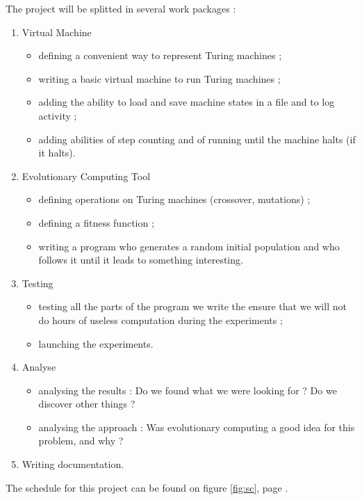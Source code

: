 \documentclass{article}
\begin{document}
The project will be splitted in several work packages :
\begin{enumerate}
\item Virtual Machine 
  \begin{itemize}
  \item defining a convenient way to represent Turing machines ;
  \item writing a basic virtual machine to run Turing machines ;
  \item adding the ability to load and save machine states in a file and to log activity ;
  \item adding abilities of step counting and of running until the machine halts (if it halts).
  \end{itemize}
\item Evolutionary Computing Tool
  \begin{itemize}
  \item defining operations on Turing machines (crossover, mutations) ;
  \item defining a fitness function ;
  \item writing a program who generates a random initial population and who follows it until it leads to something interesting.
  \end{itemize}
\item Testing
  \begin{itemize}
  \item testing all the parts of the program we write the ensure that we will not do hours of useless computation during the experiments ;
  \item launching the experiments.
  \end{itemize}
\item Analyse
  \begin{itemize}
  \item analysing the results : Do we found what we were looking for ? Do we discover other things ?
  \item analysing the approach : Was evolutionary computing a good idea for this problem, and why ?
  \end{itemize}
\item Writing documentation.
\end{enumerate}

The schedule for this project can be found on figure \ref{fig:sc}, page \pageref{fig:sc}.
\end{document}

